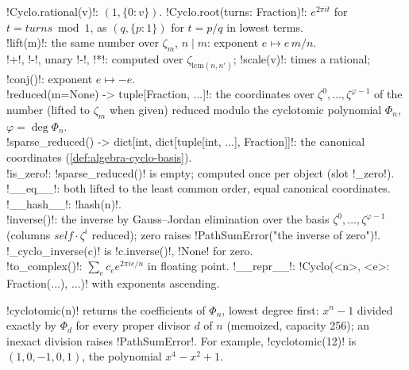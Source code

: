 \begin{signature}
\py!Cyclo.rational(v)!: $(1,\{0:v\})$. \py!Cyclo.root(turns: Fraction)!: $e^{2\pi i t}$ for $t=\mathit{turns}\bmod 1$, as $(q,\{p:1\})$ for $t=p/q$ in lowest terms.\\
\py!lift(m)!: the same number over $\zeta_m$, $n\mid m$: exponent $e\mapsto e\,m/n$.\\
\py!+!, \py!-!, unary \py!-!, \py!*!: computed over $\zeta_{\mathrm{lcm}(n,n')}$; \py!scale(v)!: times a rational; \py!conj()!: exponent $e\mapsto -e$.\\
\py!reduced(m=None) -> tuple[Fraction, ...]!: the coordinates over $\zeta^0,\ldots,\zeta^{\varphi-1}$ of the number (lifted to $\zeta_m$ when given) reduced modulo the cyclotomic polynomial $\Phi_n$, $\varphi=\deg\Phi_n$.\\
\py!sparse_reduced() -> dict[int, dict[tuple[int, ...], Fraction]]!: the canonical coordinates (\cref{def:algebra-cyclo-basis}).\\
\py!is_zero!: \py!sparse_reduced()! is empty; computed once per object (slot \code!_zero!). \py!__eq__!: both lifted to the least common order, equal canonical coordinates. \py!__hash__!: \py!hash(n)!.\\
\py!inverse()!: the inverse by Gauss--Jordan elimination over the basis $\zeta^0,\ldots,\zeta^{\varphi-1}$ (columns $\mathit{self}\cdot\zeta^i$ reduced); zero raises \py!PathSumError("the inverse of zero")!. \py!_cyclo_inverse(c)! is \py!c.inverse()!, \py!None! for zero.\\
\py!to_complex()!: $\sum_e c_e e^{2\pi ie/n}$ in floating point. \py!__repr__!: \code!Cyclo(<n>, {<e>: Fraction(...), ...})! with exponents ascending.
\end{signature}

\begin{definition}\label{def:algebra-cyclotomic}
\py!cyclotomic(n)! returns the coefficients of $\Phi_n$, lowest degree first: $x^n-1$ divided exactly by $\Phi_d$ for every proper divisor $d$ of $n$ (memoized, capacity 256); an inexact division raises \py!PathSumError!. For example, \py!cyclotomic(12)! is $(1,0,-1,0,1)$, the polynomial $x^4-x^2+1$.
\end{definition}

